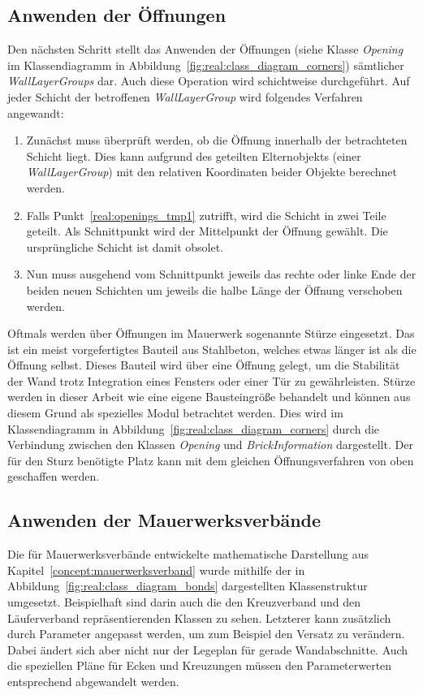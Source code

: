 \subsection{Anwenden der Öffnungen}\label{real:openings}
Den nächsten Schritt stellt das Anwenden der Öffnungen (siehe Klasse \textit{Opening} im Klassendiagramm in Abbildung~\ref{fig:real:class_diagram_corners}) sämtlicher \textit{WallLayerGroups} dar.
Auch diese Operation wird schichtweise durchgeführt.
Auf jeder Schicht der betroffenen \textit{WallLayerGroup} wird folgendes Verfahren angewandt:
\begin{enumerate}
  \item\label{real:openings_tmp1} Zunächst muss überprüft werden, ob die Öffnung innerhalb der betrachteten Schicht liegt. Dies kann aufgrund des geteilten Elternobjekts (einer \textit{WallLayerGroup}) mit den relativen Koordinaten beider Objekte berechnet werden. 
  \item Falls Punkt~\ref{real:openings_tmp1} zutrifft, wird die Schicht in zwei Teile geteilt. Als Schnittpunkt wird der Mittelpunkt der Öffnung gewählt. Die ursprüngliche Schicht ist damit obsolet.
  \item Nun muss ausgehend vom Schnittpunkt jeweils das rechte oder linke Ende der beiden neuen Schichten um jeweils die halbe Länge der Öffnung verschoben werden.
\end{enumerate}
Oftmals werden über Öffnungen im Mauerwerk sogenannte Stürze eingesetzt.
Das ist ein meist vorgefertigtes Bauteil aus Stahlbeton, welches etwas länger ist als die Öffnung selbst.
Dieses Bauteil wird über eine Öffnung gelegt, um die Stabilität der Wand trotz Integration eines Fensters oder einer Tür zu gewährleisten.
Stürze werden in dieser Arbeit wie eine eigene Bausteingröße behandelt und können aus diesem Grund als spezielles Modul betrachtet werden.
Dies wird im Klassendiagramm in Abbildung~\ref{fig:real:class_diagram_corners} durch die Verbindung zwischen den Klassen \textit{Opening} und \textit{BrickInformation} dargestellt.
Der für den Sturz benötigte Platz kann mit dem gleichen Öffnungsverfahren von oben geschaffen werden.

\subsection{Anwenden der Mauerwerksverbände}\label{real:verband}
Die für Mauerwerksverbände entwickelte mathematische Darstellung aus Kapitel~\ref{concept:mauerwerksverband} wurde mithilfe der in Abbildung~\ref{fig:real:class_diagram_bonds} dargestellten Klassenstruktur umgesetzt.
Beispielhaft sind darin auch die den Kreuzverband und den Läuferverband repräsentierenden Klassen zu sehen.
Letzterer kann zusätzlich durch Parameter angepasst werden, um zum Beispiel den Versatz zu verändern.
Dabei ändert sich aber nicht nur der Legeplan für gerade Wandabschnitte.
Auch die speziellen Pläne für Ecken und Kreuzungen müssen den Parameterwerten entsprechend abgewandelt werden.

